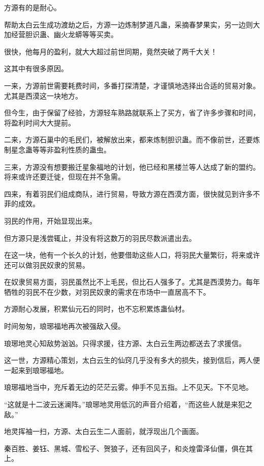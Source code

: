 
\begin{this_body}

方源有的是耐心。

帮助太白云生成功渡劫之后，方源一边炼制梦道凡蛊，采摘春梦果实，另一边则大加经营胆识蛊、幽火龙蟒等等买卖。

很快，他每月的盈利，就大大超过前世同期，竟然突破了两千大关！

这其中有很多原因。

一来，方源前世需要耗费时间，多番打探清楚，才谨慎地选择出合适的贸易对象。尤其是西漠这一块地方。

但今生，由于保留了经验，方源轻车熟路就联系上了买方，省了许多步骤和时间，将盈利时间大大提前。

二来，方源石巢中的毛民们，被解放出来，都来炼制胆识蛊。而不像前世，还要炼制星念蛊等等非盈利性质的蛊虫。

三来，方源没有想要搬迁星象福地的计划，他已经和黑楼兰等人达成了新的盟约。将来或许还要迁徙，但现在并不急需。

四来，有着羽民们组成商队，进行贸易，导致方源在西漠方面，很快就见到许多不菲的成效。

羽民的作用，开始显现出来。

但方源只是浅尝辄止，并没有将这数万的羽民尽数派遣出去。

在这一块，他有一个长久的计划，他要借助这些人口，将羽民大量繁衍，将来或许还可以做羽民奴隶的贸易。

在奴隶贸易方面，羽民虽然比不上毛民，但比石人强多了。尤其是西漠势力。每年牺牲的羽民不在少数，对羽民奴隶的需求在市场中一直居高不下。

方源耐心发展，积累仙元石的同时，也不忘积累炼蛊仙材。

时间匆匆，琅琊福地再次被强敌入侵。

琅琊地灵心知敌势汹汹。只得求援，往方源、太白云生两边都送去了求援信。

这一世，方源精心策划，太白云生的仙窍几乎没有多大的损失，接到信后，两人便一起来到琅琊福地。

琅琊福地当中，充斥着无边的茫茫云雾。伸手不见五指。上不见天。下不见地。

“这就是十二波云迷澜阵。”琅琊地灵用低沉的声音介绍着，“而这些人就是来犯之敌。”

地灵挥袖一扫，方源、太白云生二人面前，就浮现出几个画面。

秦百胜、姜钰、黑城、雪松子、贺狼子，还有回风子，和炎煌雷泽仙僵，俱在其上。


\end{this_body}
